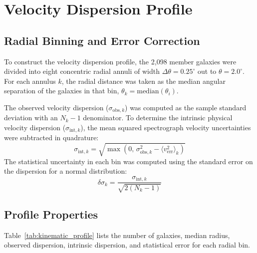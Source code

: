 \documentclass[twocolumn]{aastex631}
\begin{document}
\section{Velocity Dispersion Profile} \label{sec:velocity_dispersion}

\subsection{Radial Binning and Error Correction}
To construct the velocity dispersion profile, the 2,098 member galaxies were divided into eight concentric radial annuli of width $\Delta\theta = 0.25^\circ$ out to $\theta = 2.0^\circ$. For each annulus $k$, the radial distance was taken as the median angular separation of the galaxies in that bin, $\theta_k = \text{median}(\theta_i)$.

The observed velocity dispersion ($\sigma_{\text{obs}, k}$) was computed as the sample standard deviation with an $N_k - 1$ denominator. To determine the intrinsic physical velocity dispersion ($\sigma_{\text{int}, k}$), the mean squared spectrograph velocity uncertainties were subtracted in quadrature:
\begin{equation}
	\sigma_{\text{int}, k} = \sqrt{\max\left(0, \, \sigma_{\text{obs}, k}^2 - \langle v_{\text{err}}^2 \rangle_k\right)}
\end{equation}
The statistical uncertainty in each bin was computed using the standard error on the dispersion for a normal distribution:
\begin{equation}
	\delta\sigma_k = \frac{\sigma_{\text{int}, k}}{\sqrt{2(N_k - 1)}}
\end{equation}

\subsection{Profile Properties}
Table~\ref{tab:kinematic_profile} lists the number of galaxies, median radius, observed dispersion, intrinsic dispersion, and statistical error for each radial bin.
\end{document}
